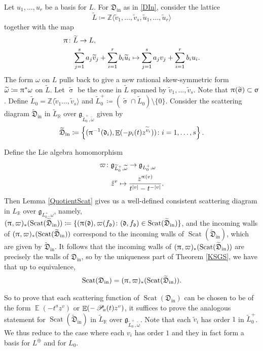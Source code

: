 \documentclass{amsart}
\DeclareMathOperator{\pl}{\mathscr{P}\!}
\DeclareMathOperator{\In}{in}
\DeclareMathOperator{\EE}{\mathbb{E}}
\DeclareMathOperator{\scat}{Scat}
\def\!{\mskip-\thinmuskip}
\let\bb=\mathbb
\let\rar=\rightarrow
\let\f=\mathfrak
\let\wt=\widetilde
\renewcommand{\pi}{\uppi\hspace{0.05em}}
\renewcommand{\sigma}{\upsigma}
\theoremstyle{plain}%
\theoremstyle{definition}
\theoremstyle{remark}
\begin{document}
Let $u_1,\ldots, u_r$ be a basis for $L$.  For $\f{D}_{\In}$ as in \eqref{DIn}, consider the lattice
$$\wt{L}\coloneqq \bb{Z}\langle 
\wt{v}_1,\ldots,\wt{v}_s,\wt{u}_1,\ldots,\wt{u}_r\rangle$$ together with the 
map 
\begin{align*}
\pi\colon &\wt{L}\rar L, \\ 
&\sum_{j=1}^{s} a_j\wt{v}_j+\sum_{i=1}^rb_i\wt{u}_i \mapsto 
\sum_{j=1}^s a_jv_j+\sum_{i=1}^rb_iu_i.
\end{align*}
The form $\omega$ on $L$ pulls back to give a new rational skew-symmetric form $\wt{\omega}\coloneqq \pi^*\omega$ on $\wt{L}$.  Let $\wt{\sigma}$ be the cone in $\wt{L}$ spanned by $\wt{v}_1,\ldots,\wt{v}_s$.  Note that $\pi(\wt{\sigma})\subset \sigma$.  Define $\wt{L}_0=\bb{Z}\langle\wt{v}_1\ldots,\wt{v}_s\rangle$ and $\wt{L}_0^+\coloneqq (\wt{\sigma}\cap \wt{L}_0)\setminus \{0\}$. Consider the scattering diagram $\wt{\f{D}}_{\In}$ in $\wt{L}_{\bb{R}}$ over $\f{g}_{\wt{L}_0^+,\wt{\omega}}$ given by
\begin{align*}
\wt{\f{D}}_{\In}\coloneqq \left\{(\pi^{-1}(\f{d}_i),\EE(-p_i(t)z^{\wt{v}_i}))\colon i=1,\ldots,s\right\}.
\end{align*}


Define the Lie algebra homomorphism
\begin{align*}
\varpi\colon&\f{g}_{\wt{L}_0^+,\wt{\omega}}\rightarrow \f{g}_{L_0^+,\omega}  \\
&\hat{z}^v\mapsto \frac{z^{\pi(v)}}{t^{\lvert v\lvert}-t^{-\lvert v\lvert}}.
\end{align*}
Then Lemma \ref{QuotientScat} gives us a well-defined consistent scattering diagram in $L_{\bb{R}}$ over $\f{g}_{L_0^+,\omega}$, namely,
$(\pi,\varpi)_*(\scat(\wt{\f{D}}_{\In}))\coloneqq \{(\pi(\f{d}),\varpi(f_{\f{d}})\colon (\f{d},f_{\f{d}})\in \scat(\wt{\f{D}}_{\In})\}$, and the incoming walls of $(\pi,\varpi)_*(\scat(\wt{\f{D}}_{\In}))$ correspond to the incoming walls of $\scat(\wt{\f{D}}_{\In})$, which are given by $\wt{\f{D}}_{\In}$.  It follows that the incoming walls of $(\pi,\varpi)_*(\scat(\wt{\f{D}}_{\In}))$ are precisely the walls of $\f{D}_{\In}$, so by the uniqueness part of Theorem \ref{KSGS}, we have that up to equivalence, 
\begin{align*}
    \scat(\f{D}_{\In})=(\pi,\varpi)_{*}(\scat(\wt{\f{D}}_{\In})).
\end{align*}


So to prove that each scattering function of $\scat(\f{D}_{\In})$ can be chosen to be of the form $\EE(-t^az^v)$ or $\EE(-\pl_{a}(t)z^v)$, it suffices to prove the analogous statement for $\scat(\wt{\f{D}}_{\In})$ in $\wt{L}_{\bb{R}}$ over $\f{g}_{\wt{L}_0^+,\wt{\omega}}$.  Note that each $\wt{v}_i$ has order $1$ in $\wt{L}_0^+$.  We thus reduce to the case where each $v_i$ has order $1$ and they in fact form a basis for $L^{\oplus}$ and for $L_0$.  
\end{document}
